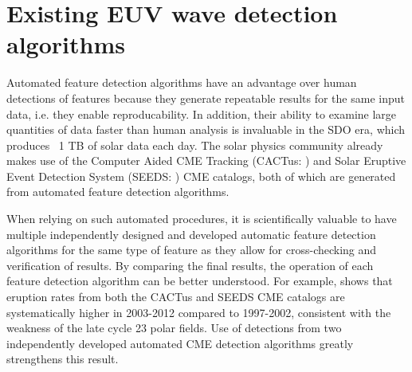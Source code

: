 \section{Existing EUV wave detection algorithms}\label{sec:existing}

Automated feature detection algorithms have an advantage over human
detections of features because they generate repeatable results for
the same input data, i.e. they enable reproducability. In addition,
their ability to examine large quantities of data faster than human
analysis is invaluable in the SDO era, which produces ~1 TB of solar
data each day. The solar physics community already makes use of the
Computer Aided CME Tracking (CACTus: \cite{2004A&A...425.1097R}) and
Solar Eruptive Event Detection System (SEEDS:
\cite{2008SoPh..248..485O}) CME catalogs, both of which are generated
from automated feature detection algorithms.

When relying on such automated procedures, it is scientifically
valuable to have multiple independently designed and developed
automatic feature detection algorithms for the same type of feature as
they allow for cross-checking and verification of results.  By
comparing the final results, the operation of each feature detection
algorithm can be better understood. For example,
\cite{2013ApJ...768..162P} shows that eruption rates from both the
CACTus and SEEDS CME catalogs are systematically higher in 2003-2012
compared to 1997-2002, consistent with the weakness of the late cycle
23 polar fields.  Use of detections from two independently developed
automated CME detection algorithms greatly strengthens this result.

